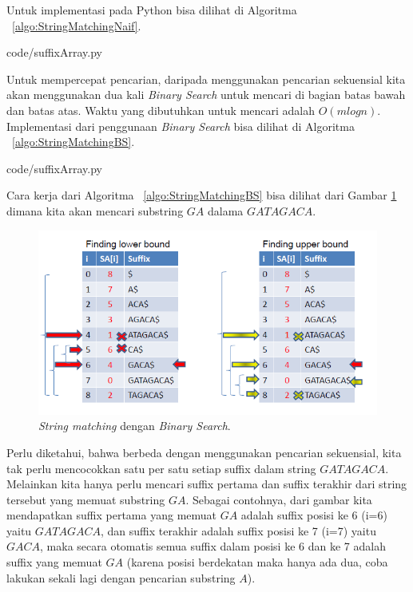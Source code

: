 Untuk implementasi pada Python bisa dilihat di Algoritma ~\ref{algo:StringMatchingNaif}.


                {code/suffixArray.py}


Untuk mempercepat pencarian, daripada menggunakan pencarian sekuensial kita akan menggunakan dua kali \textit{Binary Search} untuk mencari di bagian batas bawah dan batas atas. Waktu yang dibutuhkan untuk mencari adalah $O(m log n)$. Implementasi dari penggunaan \textit{Binary Search} bisa dilihat di Algoritma ~\ref{algo:StringMatchingBS}. 


                {code/suffixArray.py}

Cara kerja dari Algoritma ~\ref{algo:StringMatchingBS} bisa dilihat dari Gambar \ref{fig:StringMatchingBS} dimana kita akan mencari substring $GA$ dalama $GATAGACA$.

	\begin{figure}
		\includegraphics[width=\textwidth,keepaspectratio]{fig/StringMatchingBS.png}%
		\caption{\textit{String matching} dengan \textit{Binary Search}.}%
		\label{fig:StringMatchingBS}%
	\end{figure}
	
Perlu diketahui, bahwa berbeda dengan menggunakan pencarian sekuensial, kita tak perlu mencocokkan satu per satu setiap suffix dalam string $GATAGACA$. Melainkan kita hanya perlu mencari suffix pertama dan suffix terakhir dari string tersebut yang memuat substring $GA$. Sebagai contohnya, dari gambar kita mendapatkan suffix pertama yang memuat $GA$ adalah suffix posisi ke 6 (i=6) yaitu $GATAGACA$, dan suffix terakhir adalah suffix posisi ke 7 (i=7) yaitu $GACA$, maka secara otomatis semua suffix dalam posisi ke 6 dan ke 7 adalah suffix yang memuat $GA$ (karena posisi berdekatan maka hanya ada dua, coba lakukan sekali lagi dengan pencarian substring $A$).

